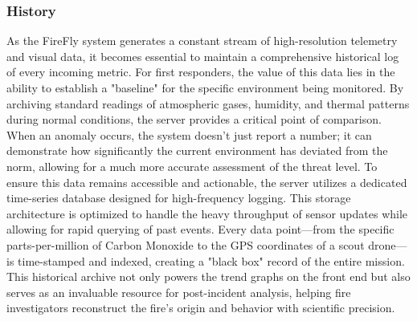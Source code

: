 \documentclass[journal, onecolumn]{IEEEtran}
\begin{document}
\subsubsection{History}
As the FireFly system generates a constant stream of high-resolution telemetry and visual data, it becomes essential to maintain a comprehensive historical log of every incoming metric. For first responders, the value of this data lies in the ability to establish a "baseline" for the specific environment being monitored. By archiving standard readings of atmospheric gases, humidity, and thermal patterns during normal conditions, the server provides a critical point of comparison. When an anomaly occurs, the system doesn't just report a number; it can demonstrate how significantly the current environment has deviated from the norm, allowing for a much more accurate assessment of the threat level.
To ensure this data remains accessible and actionable, the server utilizes a dedicated time-series database designed for high-frequency logging. This storage architecture is optimized to handle the heavy throughput of sensor updates while allowing for rapid querying of past events. Every data point—from the specific parts-per-million of Carbon Monoxide to the GPS coordinates of a scout drone—is time-stamped and indexed, creating a "black box" record of the entire mission. This historical archive not only powers the trend graphs on the front end but also serves as an invaluable resource for post-incident analysis, helping fire investigators reconstruct the fire's origin and behavior with scientific precision.

\vspace{0.5em}
\end{document}
